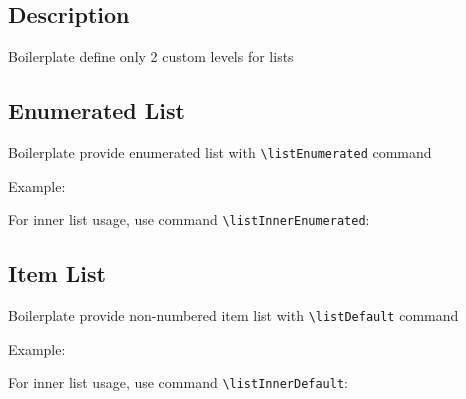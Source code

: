 \documentclass{lib/styles/default-style}
\begin{document}
\pagestyle{no-numbered}
\subsection*{\textbf{Description}}
Boilerplate define only 2 custom levels for lists

\subsection*{\textbf{Enumerated List}}

Boilerplate provide enumerated list with \verb+\listEnumerated+ command 

Example:

For inner list usage, use command \verb+\listInnerEnumerated+:

\subsection*{\textbf{Item List}}

Boilerplate provide non-numbered item list with \verb+\listDefault+ command

Example:

For inner list usage, use command \verb+\listInnerDefault+:
\end{document}
